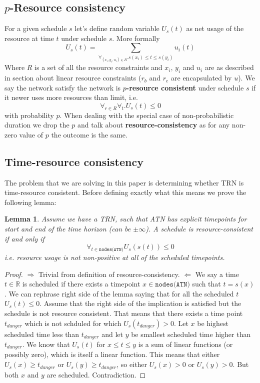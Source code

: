 \documentclass{article}
\newtheorem{lemma}[theorem]{Lemma}
\begin{document}
\begin{multicols}{2}
\subsection{$p$-Resource consistency}
For a given schedule $s$ let's define random variable $U_s(t)$ as net usage of the resource at time $t$ under schedule $s$. More formally
\[
U_s(t) = \sum_{\forall_{(x_i,y_i,u_i) \in R}. s(x_i)\leq t \leq s(y_i)} u_i(t)
\]
Where $R$ is a set of all the resource constraints and $x_i$, $y_i$ and $u_i$ are as described in section about linear resource constraints ($r_b$ and $r_e$ are encapsulated by $u$). We say the network satisfy the network is \textbf{$p$-resource consistent} under schedule $s$ if it newer uses more resources than limit, i.e.
\[
\forall_{r \in R} \forall_{t} . U_s(t) \leq 0
\]
with probability $p$. When dealing with the special case of non-probabilistic duration we drop the $p$ and talk about \textbf{resource-consistency} as for any non-zero value of $p$ the outcome is the same.

\subsection{Time-resource consistency}
The problem that we are solving in this paper is determining whether TRN is time-resource consistent. Before defining exactly what this means we prove the following lemma:

\begin{lemma}
\label{resource_checking}
Assume we have a TRN, such that ATN has explicit timepoints for start and end of the time horizon (can be $\pm \infty$).
A schedule is resource-consistent if and only if
\[
\forall_{t \in \texttt{nodes(ATN)}} U_s(s(t)) \leq 0
\]
i.e. resource usage is not non-positive at all of the scheduled timepoints.
\end{lemma}
\begin{proof}
$\Rightarrow$ Trivial from definition of resource-consistency.
$\Leftarrow$ We say a time $t \in \mathbb{R}$ is scheduled if there exists a timepoint  $x \in \texttt{nodes(ATN)}$ such that $t = s(x)$. We can rephrase right side of the lemma saying that for all the scheduled $t$ $U_s(t) \leq 0$. Assume that the right side of the implication is satisfied but the schedule is not resource consistent. That means that there exists a time point $t_{danger}$ which is not schduled for which $U_s(t_{danger}) > 0 $. Let $x$ be highest scheduled time less than $t_{danger}$ and let $y$ be smallest scheduled time higher than $t_{danger}$. We know that $U_s(t)$ for $x \leq t \leq y$ is a sum of linear functions (or possibly zero), which is itself a linear function. This means that either $U_s(x) \geq t_{danger}$ or $U_s(y) \geq t_{danger}$, so either $U_s(x) > 0$ or $U_s(y) > 0$. But both $x$ and $y$ are scheduled. Contradiction.


\end{proof}
\end{multicols}
\end{document}
